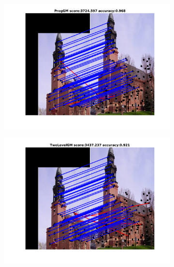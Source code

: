 \documentclass[
	fontsize=12pt,
	paper=a4,
	twoside=false,
	numbers=noenddot,
	plainheadsepline,
	toc=listof,
	toc=bibliography
]{scrartcl}
\begin{document}
\begin{figure}[h]
	\begin{subfigure}[b]{0.33\textwidth}
		\centering
		\includegraphics[scale=0.25]{"fig_ver2608/RealImages/ImgTrafo/anchor_descr/using_cpd_afftrafo/fi_4_ProgGM"} 
	\end{subfigure}%
	\begin{subfigure}[b]{0.33\textwidth}
		\centering
		\includegraphics[scale=0.25]{"fig_ver2608/RealImages/ImgTrafo/anchor_descr/using_cpd_afftrafo/fi_4_TwoLevelGM"} 
	\end{subfigure} 
	\begin{subfigure}[b]{0.33\textwidth}
		\centering

\end{subfigure}
\end{figure}
\end{document}
